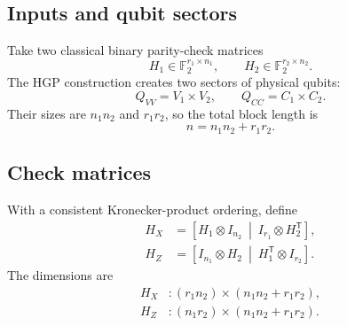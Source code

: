 \documentclass[11pt,letterpaper]{article}
\newcommand{\F}{\mathbb{F}_2}
\begin{document}
\subsection{Inputs and qubit sectors}

Take two classical binary parity-check matrices
\begin{equation}
  H_1\in\F^{r_1\times n_1},\qquad H_2\in\F^{r_2\times n_2}.
\end{equation}
The HGP construction creates two sectors of physical qubits:
\begin{equation}
  Q_{VV}=V_1\times V_2,\qquad Q_{CC}=C_1\times C_2.
\end{equation}
Their sizes are $n_1n_2$ and $r_1r_2$, so the total block length is
\begin{equation}
  n=n_1n_2+r_1r_2.
\end{equation}

\begin{center}
\end{center}

\subsection{Check matrices}

With a consistent Kronecker-product ordering, define
\begin{align}
  H_X &= \left[H_1\otimes I_{n_2}\ \middle|\ I_{r_1}\otimes H_2^{\mathsf T}\right],
  \label{eq:hgp-hx}\\
  H_Z &= \left[I_{n_1}\otimes H_2\ \middle|\ H_1^{\mathsf T}\otimes I_{r_2}\right].
  \label{eq:hgp-hz}
\end{align}
The dimensions are
\begin{align}
  H_X &: (r_1n_2)\times(n_1n_2+r_1r_2),\\
  H_Z &: (n_1r_2)\times(n_1n_2+r_1r_2).
\end{align}
\end{document}
